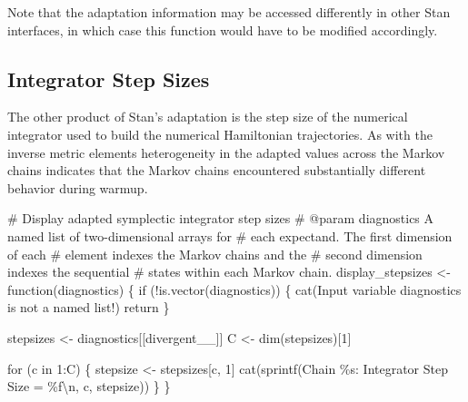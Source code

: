 \documentclass[
  letterpaper,
  DIV=11,
  numbers=noendperiod]{scrartcl}
\newenvironment{Shaded}{\begin{snugshade}}{\end{snugshade}}
\newcommand{\CommentTok}[1]{\textcolor[rgb]{0.37,0.37,0.37}{#1}}
\newcommand{\ControlFlowTok}[1]{\textcolor[rgb]{0.00,0.23,0.31}{#1}}
\newcommand{\DecValTok}[1]{\textcolor[rgb]{0.68,0.00,0.00}{#1}}
\newcommand{\FunctionTok}[1]{\textcolor[rgb]{0.28,0.35,0.67}{#1}}
\newcommand{\NormalTok}[1]{\textcolor[rgb]{0.00,0.23,0.31}{#1}}
\newcommand{\OtherTok}[1]{\textcolor[rgb]{0.00,0.23,0.31}{#1}}
\newcommand{\SpecialCharTok}[1]{\textcolor[rgb]{0.37,0.37,0.37}{#1}}
\newcommand{\StringTok}[1]{\textcolor[rgb]{0.13,0.47,0.30}{#1}}
\begin{document}
Note that the adaptation information may be accessed differently in
other Stan interfaces, in which case this function would have to be
modified accordingly.

\hypertarget{integrator-step-sizes}{%
\subsection{Integrator Step Sizes}\label{integrator-step-sizes}}

The other product of Stan's adaptation is the step size of the numerical
integrator used to build the numerical Hamiltonian trajectories. As with
the inverse metric elements heterogeneity in the adapted values across
the Markov chains indicates that the Markov chains encountered
substantially different behavior during warmup.

\begin{Shaded}
\begin{Highlighting}[]
\CommentTok{\# Display adapted symplectic integrator step sizes}
\CommentTok{\# @param diagnostics A named list of two{-}dimensional arrays for }
\CommentTok{\#                    each expectand.  The first dimension of each}
\CommentTok{\#                    element indexes the Markov chains and the }
\CommentTok{\#                    second dimension indexes the sequential }
\CommentTok{\#                    states within each Markov chain.}
\NormalTok{display\_stepsizes }\OtherTok{\textless{}{-}} \ControlFlowTok{function}\NormalTok{(diagnostics) \{}
  \ControlFlowTok{if}\NormalTok{ (}\SpecialCharTok{!}\FunctionTok{is.vector}\NormalTok{(diagnostics)) \{}
    \FunctionTok{cat}\NormalTok{(}\StringTok{\textquotesingle{}Input variable \textasciigrave{}diagnostics\textasciigrave{} is not a named list!\textquotesingle{}}\NormalTok{)}
\NormalTok{    return}
\NormalTok{  \}}
  
\NormalTok{  stepsizes }\OtherTok{\textless{}{-}}\NormalTok{ diagnostics[[}\StringTok{\textquotesingle{}divergent\_\_\textquotesingle{}}\NormalTok{]]}
\NormalTok{  C }\OtherTok{\textless{}{-}} \FunctionTok{dim}\NormalTok{(stepsizes)[}\DecValTok{1}\NormalTok{]}
  
  \ControlFlowTok{for}\NormalTok{ (c }\ControlFlowTok{in} \DecValTok{1}\SpecialCharTok{:}\NormalTok{C) \{}
\NormalTok{    stepsize }\OtherTok{\textless{}{-}}\NormalTok{ stepsizes[c, }\DecValTok{1}\NormalTok{]}
    \FunctionTok{cat}\NormalTok{(}\FunctionTok{sprintf}\NormalTok{(}\StringTok{\textquotesingle{}Chain \%s: Integrator Step Size = \%f}\SpecialCharTok{\textbackslash{}n}\StringTok{\textquotesingle{}}\NormalTok{,}
\NormalTok{                c, stepsize))}
\NormalTok{  \}}
\NormalTok{\}}
\end{Highlighting}
\end{Shaded}
\end{document}
